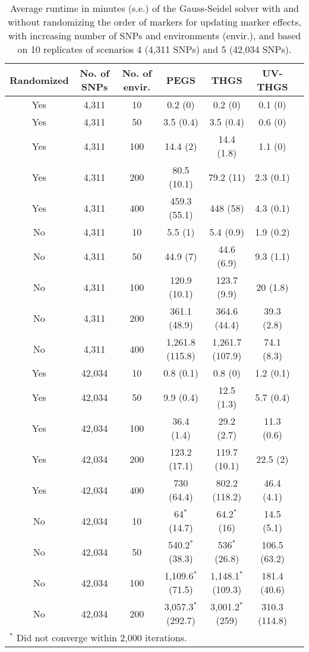 \documentclass{bmcart}
\begin{document}
\begin{table}[ht]
\centering
\renewcommand*{\arraystretch}{1.2}
\caption{Average runtime in minutes (s.e.) of the Gauss-Seidel solver with and without randomizing the order of markers for updating marker effects, with increasing number of SNPs and environments (envir.), and based on 10 replicates of scenarios 4 (4,311 SNPs) and 5 (42,034 SNPs).}\smallskip
\begin{tabular}{c c c c c c c}
 \hline
 Randomized & No. of SNPs & No. of envir. & PEGS & THGS & UV-THGS \\ 
 \hline
Yes &  4,311 &  10 & 0.2 (0) & 0.2 (0) & 0.1 (0) & \\
Yes &  4,311 &  50 & 3.5 (0.4) & 3.5 (0.4) & 0.6 (0) & \\
Yes &  4,311 & 100 & 14.4 (2) & 14.4 (1.8) & 1.1 (0) & \\
Yes &  4,311 & 200 & 80.5 (10.1) & 79.2 (11) & 2.3 (0.1) & \\
Yes &  4,311 & 400 & 459.3 (55.1) & 448 (58) & 4.3 (0.1) & \\
No &  4,311 &  10 & 5.5 (1) & 5.4 (0.9) & 1.9 (0.2) & \\
No &  4,311 &  50 & 44.9 (7) & 44.6 (6.9) & 9.3 (1.1) & \\
No &  4,311 & 100 & 120.9 (10.1) & 123.7 (9.9) & 20 (1.8) & \\
No &  4,311 & 200 & 361.1 (48.9) & 364.6 (44.4) & 39.3 (2.8) & \\
No &  4,311 & 400 & 1,261.8 (115.8) & 1,261.7 (107.9) & 74.1 (8.3) & \\
Yes & 42,034 &  10 & 0.8 (0.1) & 0.8 (0) & 1.2 (0.1) & \\
Yes & 42,034 &  50 & 9.9 (0.4) & 12.5 (1.3) & 5.7 (0.4) & \\
Yes & 42,034 & 100 & 36.4 (1.4) & 29.2 (2.7) & 11.3 (0.6) & \\
Yes & 42,034 & 200 & 123.2 (17.1) & 119.7 (10.1) & 22.5 (2) & \\
Yes & 42,034 & 400 & 730 (64.4) & 802.2 (118.2) & 46.4 (4.1) & \\
No & 42,034 &  10 & 64$^*$ (14.7) & 64.2$^*$ (16) & 14.5 (5.1) & \\
No & 42,034 &  50 & 540.2$^*$ (38.3) & 536$^*$ (26.8) & 106.5 (63.2) & \\
No & 42,034 & 100 & 1,109.6$^*$ (71.5) & 1,148.1$^*$ (109.3) & 181.4 (40.6) & \\
No & 42,034 & 200 & 3,057.3$^*$ (292.7) & 3,001.2$^*$ (259) & 310.3 (114.8) & \\
\hline
\multicolumn{4}{l}{\small{$^*$ Did not converge within 2,000 iterations.}} \\
\end{tabular}
\label{RUNTIME2}
\end{table}
\end{document}
